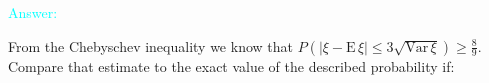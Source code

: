 \documentclass[14pt]{exam}
\def\Var{{\textrm{Var}}\,}
\def\E{{\textrm{E}}\,}
\def\Exp{{\textrm{Exp}}\,}
\begin{document}
\begin{questions}
		\textcolor{cyan}{Answer:}
		
		\question
		From the Chebyschev inequality we know that $P(|\xi - \E\xi| \leq 3\sqrt{\Var\xi}) \geq \frac{8}{9}$. Compare that estimate to the exact value of the described probability if:
		
		
		


	
		
		
%		


\end{questions}
\end{document}
